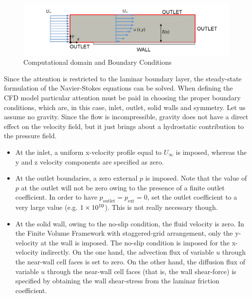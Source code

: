 \documentclass[12pt]{article}
\begin{document}
                \begin{figure}[ht!]
                        \centering
                        \includegraphics[width=\textwidth]{Domain.png}
                        \caption{Computational domain and Boundary Conditions}
                        \label{fig:domain}
                \end{figure}

                Since the attention is restricted to the laminar boundary layer, the steady-state formulation of the Navier-Stokes equations can be solved. When defining the CFD model particular attention must be paid in choosing the proper boundary conditions, which are, in this case, inlet, outlet, solid walls and symmetry. Let us assume no gravity. Since the flow is incompressible, gravity does not have a direct effect on the velocity field, but it just brings about a hydrostatic contribution to the pressure field.

                \begin{itemize}
                        \item At the inlet, a uniform x-velocity profile equal to \( U_\infty \) is imposed, whereas the y and z velocity components are specified as zero.
                        \item At the outlet boundaries, a zero external \( p \) is imposed. Note that the value of \( p \) at the outlet will not be zero owing to the presence of a finite outlet coefficient. In order to have $ p_\text{outlet} = p_\text{ext} = 0 $, set the outlet coefficient to a very large value (e.g. $ \num{1E10} $). This is not really necessary though.
                        \item At the solid wall, owing to the no-slip condition, the fluid velocity is zero. In the Finite Volume Framework with staggered-grid arrangement, only the y-velocity at the wall is imposed. The no-slip condition is imposed for the x-velocity indirectly. On the one hand, the advection flux of variable \( u \) through the near-wall cell faces is set to zero. On the other hand, the diffusion flux of variable \( u \) through the near-wall cell faces (that is, the wall shear-force) is specified by obtaining the wall shear-stress from the laminar friction coefficient.
                \end{itemize}
\end{document}
